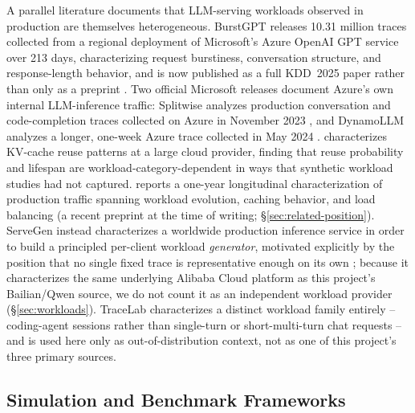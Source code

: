 A parallel literature documents that LLM-serving workloads observed in
production are themselves heterogeneous. BurstGPT releases 10.31 million
traces collected from a regional deployment of Microsoft's Azure OpenAI GPT
service over 213 days, characterizing request burstiness, conversation
structure, and response-length behavior, and is now published as a full
KDD~2025 paper rather than only as a preprint \citep{burstgpt2025}. Two
official Microsoft releases document Azure's own internal LLM-inference
traffic: Splitwise analyzes production conversation and code-completion
traces collected on Azure in November 2023 \citep{patel2024splitwise}, and
DynamoLLM analyzes a longer, one-week Azure trace collected in May 2024
\citep{stojkovic2025dynamollm}. \citet{kvcache_wild2025} characterizes
KV-cache reuse patterns at a large cloud provider, finding that reuse
probability and lifespan are workload-category-dependent in ways that
synthetic workload studies had not captured. \citet{ayearinllmserving2026}
reports a one-year longitudinal characterization of production traffic
spanning workload evolution, caching behavior, and load balancing (a recent
preprint at the time of writing; \S\ref{sec:related-position}).
ServeGen instead characterizes a worldwide production inference service in
order to build a principled per-client workload \emph{generator}, motivated
explicitly by the position that no single fixed trace is representative
enough on its own \citep{servegen2026}; because it characterizes the same
underlying Alibaba Cloud platform as this project's Bailian/Qwen source, we
do not count it as an independent workload provider (\S\ref{sec:workloads}).
TraceLab characterizes a distinct workload family entirely -- coding-agent
sessions rather than single-turn or short-multi-turn chat requests -- and is
used here only as out-of-distribution context, not as one of this
project's three primary sources.

\subsection{Simulation and Benchmark Frameworks}
\label{sec:related-simulators}

